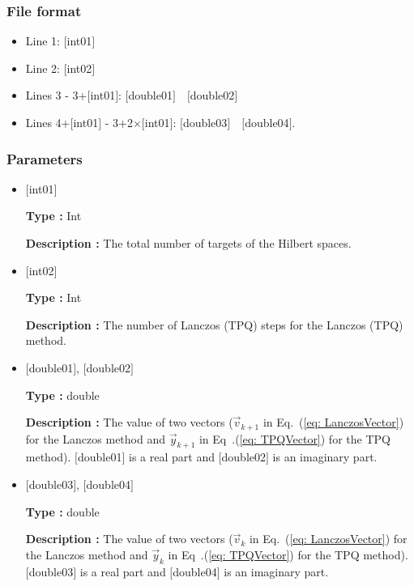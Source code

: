 \subsubsection{File format}
 \begin{itemize}
   \item  Line 1: $[$int01$]$
   \item  Line 2: $[$int02$]$
   \item  Lines 3 - 3+$[$int01$]$: $[$double01$]$~~$[$double02$]$
   \item  Lines 4+$[$int01$]$ - 3+2$\times[$int01$]$: $[$double03$]$~~$[$double04$]$.
  \end{itemize}

\subsubsection{Parameters}
 \begin{itemize}

  \item  $[$int01$]$

 {\bf Type :} Int

{\bf Description :}  The total number of targets of the Hilbert spaces.

  \item  $[$int02$]$

 {\bf Type :} Int

{\bf Description :}  { The number of Lanczos (TPQ) steps for the Lanczos (TPQ) method.}

 \item  $[$double01$]$, $[$double02$]$ 

 {\bf Type :} double 

{\bf Description :} The value of two vectors ($\vec{v}_{k+1}$ in Eq.~(\ref{eq: LanczosVector}) for the Lanczos method and $\vec{y}_{k+1}$ in Eq~.(\ref{eq: TPQVector}) for the TPQ method). $[$double01$]$ is a real part and $[$double02$]$ is an imaginary part.

 \item  $[$double03$]$, $[$double04$]$ 

 {\bf Type :} double 

{\bf Description :} The value of two vectors ($\vec{v}_{k}$ in Eq.~(\ref{eq: LanczosVector}) for the Lanczos method and $\vec{y}_{k}$ in Eq~.(\ref{eq: TPQVector}) for the TPQ method). $[$double03$]$ is a real part and $[$double04$]$ is an imaginary part.\\

 \end{itemize}

